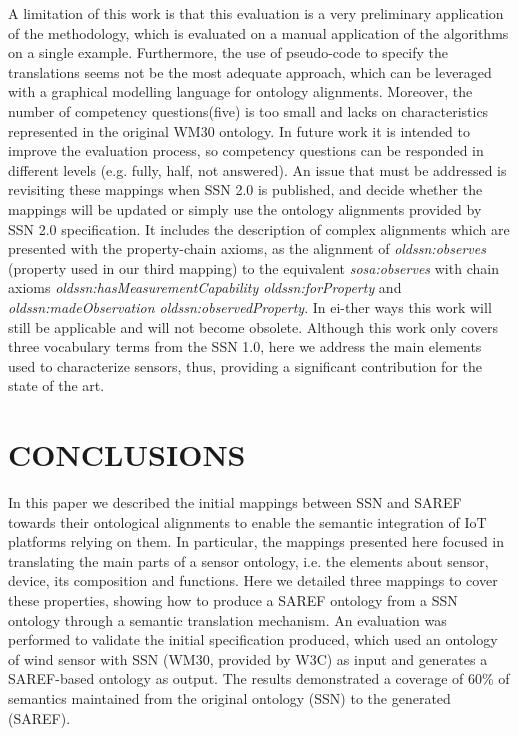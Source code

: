 \documentclass{sig-alternate-05-2015}
\begin{document}
A limitation of this work is that this evaluation is a very preliminary application of the methodology, which is evaluated on a manual application of the algorithms on a single example. Furthermore, the use of pseudo-code to specify the translations seems not be the most adequate approach, which can be leveraged with a graphical modelling language for ontology alignments. Moreover, the number of competency questions(five) is too small and lacks on characteristics represented in the original WM30 ontology. In future work it is intended to improve the evaluation process, so competency questions can be responded in different levels (e.g. fully, half, not answered). An issue that must be addressed is revisiting these mappings when SSN 2.0 is published, and decide whether the mappings will be updated or simply use the ontology alignments provided by SSN 2.0 specification. It includes the description of complex alignments which are presented with the property-chain axioms, as the alignment of \textit{oldssn:observes} (property used in our third mapping) to the equivalent \textit{sosa:observes} with chain axioms \textit{oldssn:hasMeasurementCapability oldssn:forProperty} and \textit{oldssn:madeObservation oldssn:observedProperty}. In ei-ther ways this work will still be applicable and will not become obsolete. Although this work only covers three vocabulary terms from the SSN 1.0, here we address the main elements used to characterize sensors, thus, providing a significant contribution for the state of the art.  


\section{CONCLUSIONS}

In this paper we described the initial mappings between SSN and SAREF towards their ontological alignments to enable the semantic integration of IoT platforms relying on them. In particular, the mappings presented here focused in translating the main parts of a sensor ontology, i.e. the elements about sensor, device, its composition and functions. Here we detailed three mappings to cover these properties, showing how to produce a SAREF ontology from a SSN ontology through a semantic translation mechanism. An evaluation was performed to validate the initial specification produced, which used an ontology of wind sensor with SSN (WM30, provided by W3C) as input and generates a SAREF-based ontology as output. The results demonstrated a coverage of 60\% of semantics maintained from the original ontology (SSN) to the generated (SAREF). 
\end{document}

